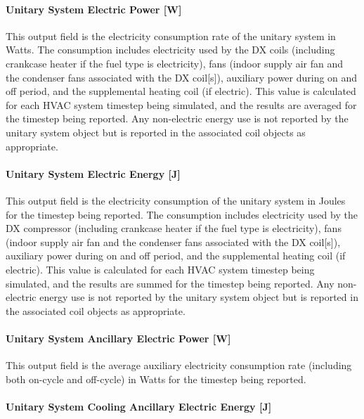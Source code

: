 \paragraph{Unitary System Electric Power {[}W{]}}\label{unitary-system-electric-power-w}

This output field is the electricity consumption rate of the unitary system in Watts. The consumption includes electricity used by the DX coils (including crankcase heater if the fuel type is electricity), fans (indoor supply air fan and the condenser fans associated with the DX coil{[}s{]}), auxiliary power during on and off period, and the supplemental heating coil (if electric). This value is calculated for each HVAC system timestep being simulated, and the results are averaged for the timestep being reported. Any non-electric energy use is not reported by the unitary system object but is reported in the associated coil objects as appropriate.

\paragraph{Unitary System Electric Energy {[}J{]}}\label{unitary-system-electric-energy-j}

This output field is the electricity consumption of the unitary system in Joules for the timestep being reported. The consumption includes electricity used by the DX compressor (including crankcase heater if the fuel type is electricity), fans (indoor supply air fan and the condenser fans associated with the DX coil{[}s{]}), auxiliary power during on and off period, and the supplemental heating coil (if electric). This value is calculated for each HVAC system timestep being simulated, and the results are summed for the timestep being reported. Any non-electric energy use is not reported by the unitary system object but is reported in the associated coil objects as appropriate.

\paragraph{Unitary System Ancillary Electric Power {[}W{]}}\label{unitary-system-ancillary-electric-power-w}

This output field is the average auxiliary electricity consumption rate (including both on-cycle and off-cycle) in Watts for the timestep being reported.

\paragraph{Unitary System Cooling Ancillary Electric Energy {[}J{]}}\label{unitary-system-cooling-ancillary-electric-energy-j}

